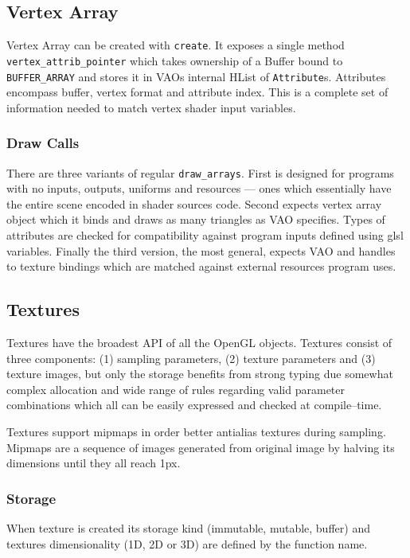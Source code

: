 \subsection{Vertex Array}

Vertex Array can be created with \texttt{create}.
It exposes a single method \texttt{vertex\_attrib\_pointer} which takes ownership of a Buffer bound to \texttt{BUFFER\_ARRAY}
and stores it in VAOs internal HList of \texttt{Attribute}s.
Attributes encompass buffer, vertex format and attribute index. This is a complete set of information needed to match vertex shader input variables.

\subsubsection{Draw Calls}

There are three variants of regular \texttt{draw\_arrays}. First is designed for programs with no inputs, outputs, uniforms and resources --- ones which essentially have the entire scene
encoded in shader sources code. 
Second expects vertex array object which it binds and draws as many triangles as VAO specifies. Types of attributes are checked for compatibility against program inputs defined using glsl variables.
Finally the third version, the most general, expects VAO and handles to texture bindings which are matched against external resources program uses. 

\subsection{Textures}

Textures have the broadest API of all the OpenGL objects.
Textures consist of three components: (1) sampling parameters, (2) texture parameters and (3) texture images, but only the storage benefits 
from strong typing due somewhat complex allocation and wide range of rules regarding valid parameter combinations which all can be easily expressed and checked at compile--time.

Textures support mipmaps in order better antialias textures during sampling. Mipmaps are a sequence of images generated from original image by halving its dimensions until they all reach 1px.

\subsubsection{Storage}

When texture is created its storage kind (immutable, mutable, buffer) and textures dimensionality (1D, 2D or 3D) are defined by the function name.

